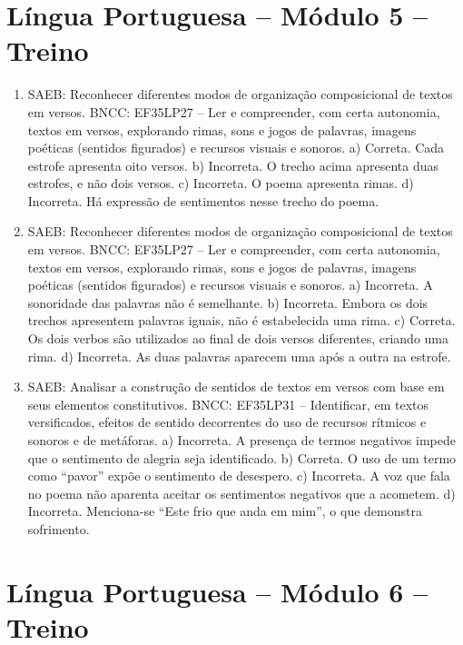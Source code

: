 \section*{Língua Portuguesa – Módulo 5 – Treino}
\begin{enumerate}
\item
SAEB: Reconhecer diferentes modos de organização composicional de textos
em versos. BNCC: EF35LP27 – Ler e compreender, com certa autonomia,
textos em versos, explorando rimas, sons e jogos de palavras, imagens
poéticas (sentidos figurados) e recursos visuais e sonoros.
a) Correta. Cada estrofe apresenta oito versos.
b) Incorreta. O trecho acima apresenta duas estrofes, e não dois versos.
c) Incorreta. O poema apresenta rimas.
d) Incorreta. Há expressão de sentimentos nesse trecho do poema.

\item
SAEB: Reconhecer diferentes modos de organização composicional de textos
em versos. BNCC: EF35LP27 – Ler e compreender, com certa autonomia,
textos em versos, explorando rimas, sons e jogos de palavras, imagens
poéticas (sentidos figurados) e recursos visuais e sonoros.
a) Incorreta. A sonoridade das palavras não é semelhante.
b) Incorreta. Embora os dois trechos apresentem palavras iguais, não é
estabelecida uma rima.
c) Correta. Os dois verbos são utilizados ao final de dois versos
diferentes, criando uma rima.
d) Incorreta. As duas palavras aparecem uma após a outra na estrofe.

\item
SAEB: Analisar a construção de sentidos de textos em versos com base em
seus elementos constitutivos. BNCC: EF35LP31 – Identificar, em textos
versificados, efeitos de sentido decorrentes do uso de recursos rítmicos
e sonoros e de metáforas.
a) Incorreta. A presença de termos negativos impede que o sentimento de
alegria seja identificado.
b) Correta. O uso de um termo como “pavor” expõe o sentimento de
desespero.
c) Incorreta. A voz que fala no poema não aparenta aceitar os sentimentos negativos que
a acometem.
d) Incorreta. Menciona-se “Este frio que anda em mim”,
o que demonstra sofrimento.
\end{enumerate}

\section*{Língua Portuguesa – Módulo 6 – Treino}

